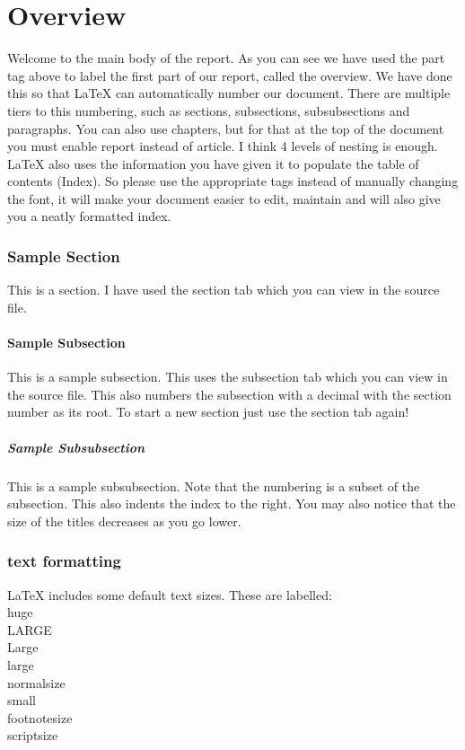 \documentclass[ 12pt,a4paper,twocolumn,fleqn]{article}
\begin{document}
\part{Overview}
Welcome to the main body of the report. As you can see we have used the part tag above to label the first part of our report, called the overview. We have done this so that \LaTeX{} can automatically number our document. There are multiple tiers to this numbering, such as sections, subsections, subsubsections and paragraphs. You can also use chapters, but for that at the top of the document you must enable report instead of article. I think 4 levels of nesting is enough. \LaTeX{} also uses the information you have given it to populate the table of contents (Index). So please use the appropriate tags instead of manually changing the font, it will make your document easier to edit, maintain and will also give you a neatly formatted index.
\section{Sample Section}
This is a section. I have used the section tab which you can view in the source file.
\subsection{Sample Subsection}
This is a sample subsection. This uses the subsection tab which you can view in the source file. This also numbers the subsection with a decimal with the section number as its root. To start a new section just use the section tab again!
\subsubsection{Sample Subsubsection}
This is a sample subsubsection. Note that the numbering is a subset of the subsection. This also indents the index to the right. You may also notice that the size of the titles decreases as you go lower.
\section{text formatting}
\LaTeX{} includes some default text sizes. These are labelled: \\
\huge{huge} \\
\LARGE{LARGE} \\
\Large{Large} \\
\large{large} \\
\normalsize{normalsize} \\
\small{small} \\
\footnotesize{footnotesize} \\
\scriptsize{scriptsize}
\newpage
  \pagestyle{fancy}
\thisfancypage{%
  \setlength{\fboxsep}{20pt}\doublebox}{}
\normalsize
\end{document}
